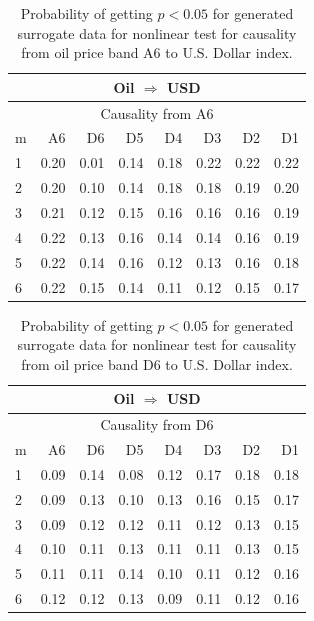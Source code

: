 %
%
\begin{table}[H]
\begin{center}
\begin{tabular}{l|r r r r r r r}
\hline\hline
\multicolumn{8}{c}{Oil $\Rightarrow$ USD}\\
\hline
\multicolumn{8}{c}{Causality from A6}\\
\hline\hline
m & A6 & D6 & D5 & D4 & D3 & D2 & D1 \\
\hline
1 & 0.20 & 0.01 & 0.14 & 0.18 & 0.22 & 0.22 & 0.22 \\
2 & 0.20 & 0.10 & 0.14 & 0.18 & 0.18 & 0.19 & 0.20 \\
3 & 0.21 & 0.12 & 0.15 & 0.16 & 0.16 & 0.16 & 0.19 \\
4 & 0.22 & 0.13 & 0.16 & 0.14 & 0.14 & 0.16 & 0.19 \\
5 & 0.22 & 0.14 & 0.16 & 0.12 & 0.13 & 0.16 & 0.18 \\
6 & 0.22 & 0.15 & 0.14 & 0.11 & 0.12 & 0.15 & 0.17 \\
\hline\hline
\end{tabular}
\caption{Probability of getting $p < 0.05$ for generated surrogate data for nonlinear test for causality from oil price band A6 to U.S. Dollar index.}
\end{center}
\end{table}

%
%
\begin{table}[H]
\begin{center}
\begin{tabular}{l|r r r r r r r}
\hline\hline
\multicolumn{8}{c}{Oil $\Rightarrow$ USD}\\
\hline
\multicolumn{8}{c}{Causality from D6}\\
\hline\hline
m & A6 & D6 & D5 & D4 & D3 & D2 & D1 \\
\hline
1 & 0.09 & 0.14 & 0.08 & 0.12 & 0.17 & 0.18 & 0.18 \\
2 & 0.09 & 0.13 & 0.10 & 0.13 & 0.16 & 0.15 & 0.17 \\
3 & 0.09 & 0.12 & 0.12 & 0.11 & 0.12 & 0.13 & 0.15 \\
4 & 0.10 & 0.11 & 0.13 & 0.11 & 0.11 & 0.13 & 0.15 \\
5 & 0.11 & 0.11 & 0.14 & 0.10 & 0.11 & 0.12 & 0.16 \\
6 & 0.12 & 0.12 & 0.13 & 0.09 & 0.11 & 0.12 & 0.16 \\
\hline\hline
\end{tabular}
\caption{Probability of getting $p < 0.05$ for generated surrogate data for nonlinear test for causality from oil price band D6 to U.S. Dollar index.}
\end{center}
\end{table}

